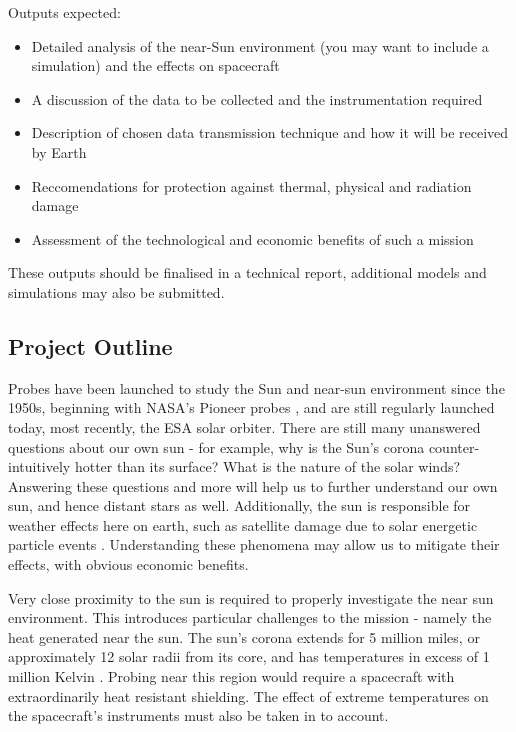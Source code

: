 \documentclass[12pt]{article}
\begin{document}
Outputs expected:
\begin{itemize}
    \item Detailed analysis of the near-Sun environment (you may want to include a simulation) and the effects on spacecraft 
    \item A discussion of the data to be collected and the instrumentation required 
    \item Description of chosen data transmission technique and how it will be received by Earth 
    \item Reccomendations for protection against thermal, physical and radiation damage 
    \item Assessment of the technological and economic benefits of such a mission 
\end{itemize}

These outputs should be finalised in a technical report, additional models and simulations may also be submitted.  

\subsection{Project Outline}
\label{project outline}

Probes have been launched to study the Sun and near-sun environment since the 1950s, beginning with NASA's Pioneer probes \cite{pioneers}, and are still regularly launched today, most recently, the ESA solar orbiter. There are still many unanswered questions about our own sun - for example, why is the Sun's corona counter-intuitively hotter than its surface? What is the nature of the solar winds? Answering these questions and more will help us to further understand our own sun, and hence distant stars as well. Additionally, the sun is responsible for weather effects here on earth, such as satellite damage due to solar energetic particle events \cite{satellites}. Understanding these phenomena may allow us to mitigate their effects, with obvious economic benefits. 

\vspace{5mm}

Very close proximity to the sun is required to properly investigate the near sun environment. This introduces particular challenges to the mission - namely the heat generated near the sun. The sun's corona extends for 5 million miles, or approximately 12 solar radii from its core, and has temperatures in excess of 1 million Kelvin \cite{corona}. Probing near this region would require a spacecraft with extraordinarily heat resistant shielding. The effect of extreme temperatures on the spacecraft's instruments must also be taken in to account.
\end{document}
